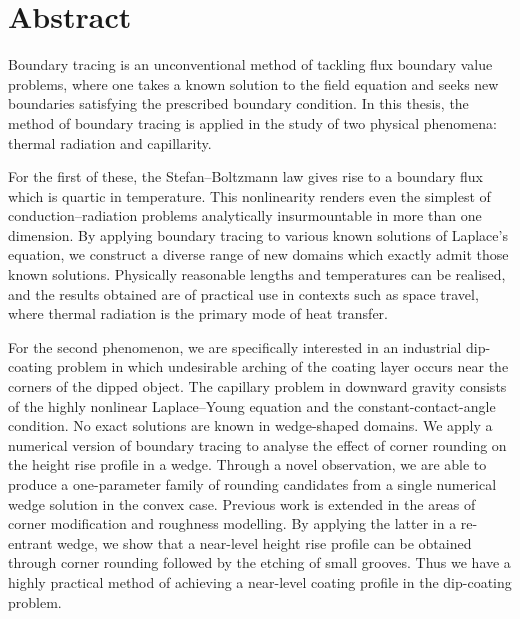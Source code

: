 \chapter*{Abstract}
\label{ch:abstract}

Boundary tracing is an unconventional method
of tackling flux boundary value problems,
where one takes a known solution to the field equation
and seeks new boundaries satisfying the prescribed boundary condition.
In this thesis, the method of boundary tracing is applied
in the study of two physical phenomena:
thermal radiation and capillarity.

For the first of these,
the Stefan--Boltzmann law gives rise
to a boundary flux which is quartic in temperature.
This nonlinearity renders
even the simplest of conduction--radiation problems
analytically insurmountable in more than one dimension.
By applying boundary tracing to various known solutions of Laplace's equation,
we construct a diverse range of new domains
which exactly admit those known solutions.
Physically reasonable lengths and temperatures can be realised,
and the results obtained are of practical use
in contexts such as space travel,
where thermal radiation is the primary mode of heat transfer.

For the second phenomenon,
we are specifically interested in an industrial dip-coating problem
in which undesirable arching of the coating layer
occurs near the corners of the dipped object.
The capillary problem in downward gravity
consists of the highly nonlinear Laplace--Young equation
and the constant-contact-angle condition.
No exact solutions are known in wedge-shaped domains.
We apply a numerical version of boundary tracing
to analyse the effect of corner rounding
on the height rise profile in a wedge.
Through a novel observation,
we are able to produce a one-parameter family of rounding candidates
from a single numerical wedge solution in the convex case.
Previous work is extended
in the areas of corner modification and roughness modelling.
By applying the latter in a re-entrant wedge,
we show that a near-level height rise profile can be obtained
through corner rounding followed by the etching of small grooves.
Thus we have a highly practical method
of achieving a near-level coating profile
in the dip-coating problem.
